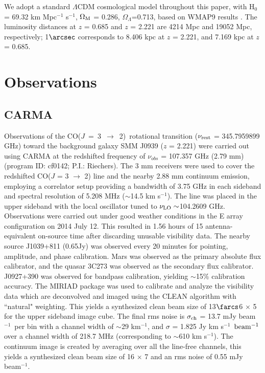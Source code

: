 \documentclass[twocolumn,apj,numberedappendix]{emulateapj}
\newcommand{\CO}{\mbox{CO($J$ = 3 $\rightarrow$ 2) }}
\newcommand{\pmOne}{$^{-1}$}
\begin{document}
We adopt a standard $\Lambda$CDM cosmological model throughout this paper, with H$_0$= 69.32 km Mpc\pmOne
s\pmOne, $\Omega_{\rm M}$ = 0.286, $\Omega_\Lambda$=0.713, based on WMAP9 results \citep{Hinshaw13a}.
The luminosity distances at $z$ = 0.685 and $z$ = 2.221 are 4214 Mpc and 19052 Mpc, respectively; 1$\arcsec$
corresponds to 8.406 kpc at $z$ = 2.221, and 7.169 kpc at $z$ = 0.685.

\section{Observations}\label{sec:obs}
\subsection{CARMA} \label{sec:carmadata}
Observations of the \CO rotational transition ($\nu_{\rm rest}$ = 345.7959899 GHz) toward the background galaxy SMM
J0939 ($z$ = 2.221) were carried out using CARMA at the redshifted frequency of $\nu_{obs}$ = 107.357 GHz (2.79 mm)  (program ID: cf0142; P.I.: Riechers). The 3 mm receivers were used to cover the redshifted CO($J$ = 3 $\rightarrow$ 2) line and the nearby 2.88 mm continuum emission, employing a correlator setup providing a bandwidth of 3.75 GHz in each sideband and spectral resolution of 5.208 MHz ($\sim$14.5 km s\pmOne). The line was placed in the
upper sideband with the local oscillator tuned to $\nu_{\rm LO}\sim$104.2609 GHz.
Observations were carried out under good
weather conditions in the E array configuration on 2014 July 12. This resulted in 1.56 hours of 15 antenna-
equivalent on-source time after discarding unusable visibility data.
The nearby source J1039+811 (0.65Jy) was observed every 20 minutes for
pointing, amplitude, and phase calibration. Mars was observed as the primary
absolute flux calibrator, and the quasar 3C273 was observed as the secondary
flux calibrator. J0927+390 was observed for bandpass calibration, yielding $\sim
$15\% calibration accuracy.
The {\sc MIRIAD} package was used to calibrate and analyze the visibility data which are deconvolved and imaged using
the CLEAN algorithm with ``natural" weighting. This yields a synthesized clean beam size of 13$\farcs$6 $\times$ 
5 for the upper sideband image cube. The final rms noise is $\sigma_{\rm ch}$ = 13.7 mJy beam\pmOne\ per bin with a channel width of $\sim$29 km\pmOne, and $\sigma$ = 1.825 Jy km s\pmOne\ $\rm beam^{-1}$ over a channel width of 218.7 MHz (corresponding to $\sim$610 km s\pmOne). The continuum image is created by
averaging over all the line-free channels, this yields a synthesized clean beam size of 16 $\times$ 7 and an 
rms noise of 0.55 mJy beam\pmOne.
\end{document}
